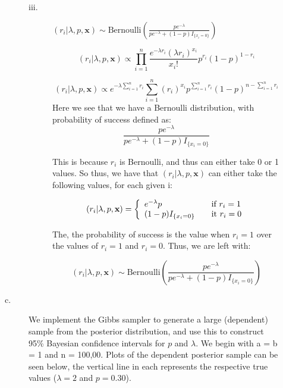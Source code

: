 \documentclass[12pt]{article}
\begin{document}
\begin{description}
\begin{description}
\begin{description}
\item[iii.] $(r_i | \lambda, p, \textbf{x}) \sim \text{Bernoulli} \left(\frac{pe^{-\lambda}}{pe^{-\lambda} + (1 - p) I_{\{x_i = 0\}}} \right)$

\[(r_i | \lambda, p, \textbf{x}) \propto \prod_{i = 1}^n \frac{e^{-\lambda r_i}(\lambda r_i)^{x_i}}{x_i!} p^{r_i} (1 - p)^{1 - r_i} \]

\[(r_i | \lambda, p, \textbf{x}) \propto  e^{-\lambda \sum_{i = 1}^n r_i} \sum_{i = 1}^n(r_i)^{x_i}p^{\sum_{i = 1}^n r_i} (1 - p)^{n - \sum_{i = 1}^n r_i}\]
Here we see that we have a Bernoulli distribution, with probability of success defined as:
\[\frac{pe^{-\lambda}}{pe^{-\lambda} + (1 - p) I_{\{x_i = 0\}}}\]

This is because $r_i$ is Bernoulli, and thus can either take 0 or 1 values. So thus, we have that $(r_i | \lambda, p, \textbf{x})$ can either take the following values, for each given i:

\[(r_i | \lambda, p, \textbf{x})   = \left\{ 
\begin{array}{l l}
 e^{-\lambda}p & \quad \text{if } r_i = 1\\
 (1 - p)I_{\{x_i = 0\}}& \quad \text{it } r_i = 0
\end{array} \right.\]

The, the probability of success is the value when $r_i = 1$ over the values of $r_i = 1$ and $r_i = 0$. Thus, we are left with:

\[(r_i | \lambda, p, \textbf{x}) \sim \text{Bernoulli} \left(\frac{pe^{-\lambda}}{pe^{-\lambda} + (1 - p) I_{\{x_i = 0\}}} \right)\]
\end{description}
\item[c.] We implement the Gibbs sampler to generate a large (dependent) sample from the posterior distribution, and use this to construct 95\% Bayesian confidence intervals for $p$ and $\lambda$. We begin with a = b = 1 and n = 100,00. Plots of the dependent posterior sample can be seen below, the vertical line in each represents the respective true values ($\lambda = 2$ and $p = 0.30$).


\end{description}
\end{description}
\end{document}
